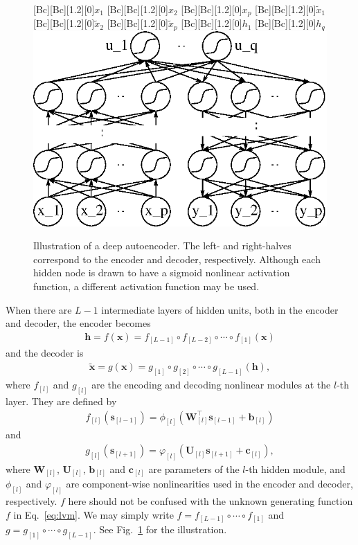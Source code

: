 \documentclass{now}
\newcommand{\qlay}[1]{\left[#1\right]}
\newcommand{\vect}[1]{\mathbf{#1}}
\newcommand{\matr}[1]{\mathbf{#1}}
\newcommand{\vb}[0]{\vect{b}}
\newcommand{\vc}[0]{\vect{c}}
\newcommand{\vh}[0]{\vect{h}}
\newcommand{\vx}[0]{\vect{x}}
\newcommand{\vs}[0]{\vect{s}}
\newcommand{\mW}[0]{\matr{W}}
\newcommand{\mU}[0]{\matr{U}}
\begin{document}
\begin{figure}[t]
    \centering
    [Bc][Bc][1.2][0]{$x_1$}
    [Bc][Bc][1.2][0]{$x_2$}
    [Bc][Bc][1.2][0]{$x_p$}
    [Bc][Bc][1.2][0]{$\tilde{x}_1$}
    [Bc][Bc][1.2][0]{$\tilde{x}_2$}
    [Bc][Bc][1.2][0]{$\tilde{x}_p$}
    [Bc][Bc][1.2][0]{$h_1$}
    [Bc][Bc][1.2][0]{$h_q$}
    \includegraphics[width=0.75\columnwidth]{../figures/deepae.eps}
    \caption{Illustration of a deep autoencoder. The left- and right-halves
    correspond to the encoder and decoder, respectively. Although each hidden
    node is drawn to have a sigmoid nonlinear activation function, a different
    activation function may be used.}
    \label{fig:dae}
\end{figure}

When there are $L-1$ intermediate layers of hidden units, both in the encoder
and decoder, the encoder becomes
\begin{align}
    \label{eq:ae_encoder}
    \vh = f(\vx) = f_{
    \qlay{L-1}} \circ f_{\qlay{L-2}} \circ \cdots \circ
    f_{\qlay{1}}(\vx)
\end{align}
and the decoder is
\begin{align}
    \label{eq:ae_decoder}
    \tilde{\vx} = g(\vx) = g_{\qlay{1}} \circ g_{\qlay{2}} \circ \cdots \circ
    g_{\qlay{L-1}} (\vh),
\end{align}
where $f_{\qlay{l}}$ and $g_{\qlay{l}}$ are the encoding and decoding nonlinear
modules at the $l$-th layer. They are defined by
\begin{align*}
    f_{\qlay{l}}(\vs_{\qlay{l-1}}) = \phi_{\qlay{l}}
    \left(\mW_{\qlay{l}}^\top \vs_{\qlay{l-1}} +
    \vb_{\qlay{l}}\right)
\end{align*}
and
\begin{align*}
    g_{\qlay{l}}(\vs_{\qlay{l+1}}) = \varphi_{\qlay{l}}
    \left(\mU_{\qlay{l}} \vs_{\qlay{l+1}} + \vc_{\qlay{l}}
    \right),
\end{align*}
where $\mW_{\qlay{l}}$, $\mU_{\qlay{l}}$, $\vb_{\qlay{l}}$ and $\vc_{\qlay{l}}$
are parameters of the $l$-th hidden module, and $\phi_{\qlay{l}}$ and
$\varphi_{\qlay{l}}$ are component-wise nonlinearities used in the encoder and
decoder, respectively.  $f$ here should not be confused with the unknown
generating function $f$ in Eq.~\eqref{eq:lvm}.  We may simply write $f =
f_{\qlay{L-1}} \circ \cdots \circ f_{\qlay{1}}$ and $g = g_{\qlay{1}} \circ
\cdots \circ g_{\qlay{L-1}}$. See Fig.~\ref{fig:dae} for the illustration.
\end{document}

